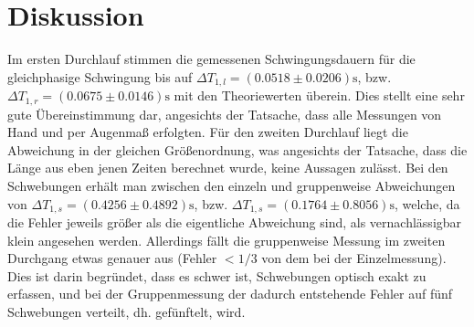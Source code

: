 \section{Diskussion}
\label{sec:Diskussion}
Im ersten Durchlauf stimmen die gemessenen Schwingungsdauern für die gleichphasige Schwingung bis auf $\Delta T_{1,l} = (0.0518 \pm 0.0206) \si{\second}$, bzw. $\Delta T_{1,r} = (0.0675 \pm 0.0146) \si{\second}$ mit den Theoriewerten überein. Dies stellt eine sehr gute Übereinstimmung dar, angesichts der Tatsache, dass alle Messungen von Hand und per Augenmaß erfolgten. Für den zweiten Durchlauf liegt die Abweichung in der gleichen Größenordnung, was angesichts der Tatsache, dass die Länge aus eben jenen Zeiten berechnet wurde, keine Aussagen zulässt.
Bei den Schwebungen erhält man zwischen den einzeln und gruppenweise Abweichungen von $\Delta T_{1,s} = (0.4256 \pm 0.4892)\si{\second}$, bzw. $\Delta T_{1,s} = (0.1764 \pm 0.8056)\si{\second}$, welche, da die Fehler jeweils größer als die eigentliche Abweichung sind, als vernachlässigbar klein angesehen werden. Allerdings fällt die gruppenweise Messung im zweiten Durchgang etwas genauer aus (Fehler $<1/3$ von dem bei der Einzelmessung). Dies ist darin begründet, dass es schwer ist, Schwebungen optisch exakt zu erfassen, und bei der Gruppenmessung der dadurch entstehende Fehler auf fünf Schwebungen verteilt, dh. gefünftelt, wird.
